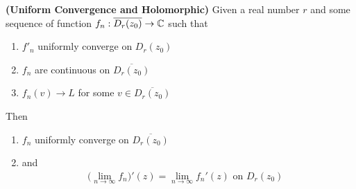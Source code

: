 \documentclass{report}
\begin{document}
\begin{theorem}
\label{UCaH}
\textbf{(Uniform Convergence and Holomorphic)} Given a real number $r$ and some sequence of function $f_n:\overline{D_r(z_0)}\rightarrow \mathbb{C}$ such that 
\begin{enumerate}[label=(\alph*)]
  \item $f'_n$ uniformly converge on  $D_r(z_0)$
  \item $f_n$ are continuous on  $\overline{D_r(z_0)}$
  \item $f_n(v)\to L$ for some $v \in \overline{D_r(z_0)}$
\end{enumerate}
Then 
\begin{enumerate}[label=(\alph*)]
  \item $f_n$ uniformly converge on  $\overline{D_r(z_0)}$ 
  \item and
\begin{align*}
\Big(\lim_{n\to \infty}f_n \Big)'(z)=\lim_{n\to \infty}f_n'(z)\text{ on $D_r(z_0)$ }
\end{align*}
\end{enumerate}
\end{theorem}
\end{document}
